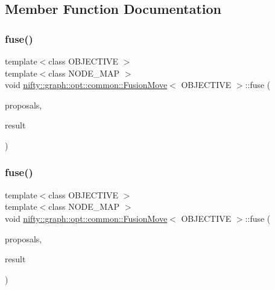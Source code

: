 \subsection{Member Function Documentation}
\mbox{\label{classnifty_1_1graph_1_1opt_1_1common_1_1FusionMove_a4a5cba40389e36c65308e9ccb8e1bec2}} 
\subsubsection{\texorpdfstring{fuse()}{fuse()}\hspace{0.1cm}{\footnotesize\ttfamily [1/2]}}
{\footnotesize\ttfamily template$<$class O\+B\+J\+E\+C\+T\+I\+VE $>$ \\
template$<$class N\+O\+D\+E\+\_\+\+M\+AP $>$ \\
void \hyperlink{classnifty_1_1graph_1_1opt_1_1common_1_1FusionMove}{nifty\+::graph\+::opt\+::common\+::\+Fusion\+Move}$<$ O\+B\+J\+E\+C\+T\+I\+VE $>$\+::fuse (\begin{DoxyParamCaption}\item[{std\+::initializer\+\_\+list$<$ const N\+O\+D\+E\+\_\+\+M\+AP $\ast$$>$}]{proposals,  }\item[{N\+O\+D\+E\+\_\+\+M\+AP $\ast$}]{result }\end{DoxyParamCaption})\hspace{0.3cm}{\ttfamily [inline]}}

\mbox{\label{classnifty_1_1graph_1_1opt_1_1common_1_1FusionMove_ade8382ba036c3e513364aa724476e7aa}} 
\subsubsection{\texorpdfstring{fuse()}{fuse()}\hspace{0.1cm}{\footnotesize\ttfamily [2/2]}}
{\footnotesize\ttfamily template$<$class O\+B\+J\+E\+C\+T\+I\+VE $>$ \\
template$<$class N\+O\+D\+E\+\_\+\+M\+AP $>$ \\
void \hyperlink{classnifty_1_1graph_1_1opt_1_1common_1_1FusionMove}{nifty\+::graph\+::opt\+::common\+::\+Fusion\+Move}$<$ O\+B\+J\+E\+C\+T\+I\+VE $>$\+::fuse (\begin{DoxyParamCaption}\item[{const std\+::vector$<$ const N\+O\+D\+E\+\_\+\+M\+AP $\ast$$>$ \&}]{proposals,  }\item[{N\+O\+D\+E\+\_\+\+M\+AP $\ast$}]{result }\end{DoxyParamCaption})\hspace{0.3cm}{\ttfamily [inline]}}



